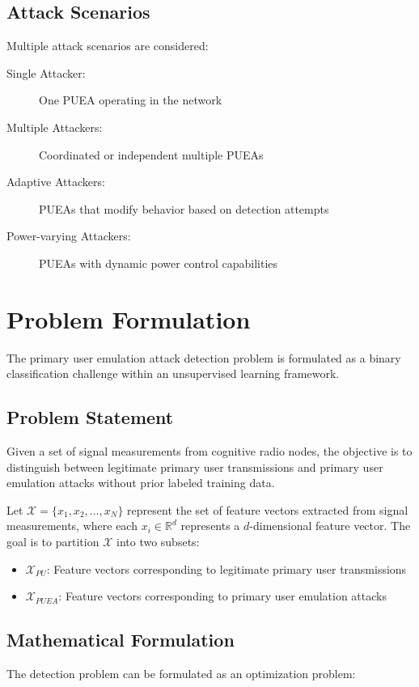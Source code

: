 \subsection{Attack Scenarios}
Multiple attack scenarios are considered:

\begin{description}
\item[Single Attacker:] One PUEA operating in the network
\item[Multiple Attackers:] Coordinated or independent multiple PUEAs
\item[Adaptive Attackers:] PUEAs that modify behavior based on detection attempts
\item[Power-varying Attackers:] PUEAs with dynamic power control capabilities
\end{description}

\section{Problem Formulation}
The primary user emulation attack detection problem is formulated as a binary classification challenge within an unsupervised learning framework.

\subsection{Problem Statement}
Given a set of signal measurements from cognitive radio nodes, the objective is to distinguish between legitimate primary user transmissions and primary user emulation attacks without prior labeled training data.

Let $\mathcal{X} = \{x_1, x_2, \ldots, x_N\}$ represent the set of feature vectors extracted from signal measurements, where each $x_i \in \mathbb{R}^d$ represents a $d$-dimensional feature vector. The goal is to partition $\mathcal{X}$ into two subsets:
\begin{itemize}
\item $\mathcal{X}_{PU}$: Feature vectors corresponding to legitimate primary user transmissions
\item $\mathcal{X}_{PUEA}$: Feature vectors corresponding to primary user emulation attacks
\end{itemize}

\subsection{Mathematical Formulation}
The detection problem can be formulated as an optimization problem:

